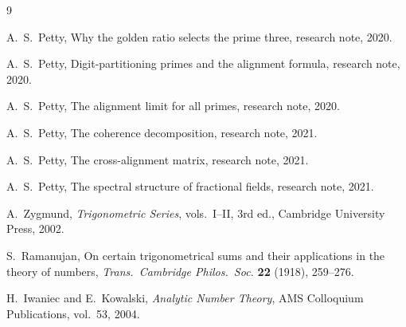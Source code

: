 \documentclass[12pt]{amsart}
\theoremstyle{definition}
\theoremstyle{remark}
\begin{document}
\begin{thebibliography}{9}

A.~S.~Petty,
Why the golden ratio selects the prime three,
research note, 2020.

A.~S.~Petty,
Digit-partitioning primes and the alignment formula,
research note, 2020.

A.~S.~Petty,
The alignment limit for all primes,
research note, 2020.

A.~S.~Petty,
The coherence decomposition,
research note, 2021.

A.~S.~Petty,
The cross-alignment matrix,
research note, 2021.

A.~S.~Petty,
The spectral structure of fractional fields,
research note, 2021.

A.~Zygmund,
\emph{Trigonometric Series}, vols.~I--II,
3rd ed., Cambridge University Press, 2002.

S.~Ramanujan,
On certain trigonometrical sums and their applications in the
theory of numbers,
\emph{Trans.\ Cambridge Philos.\ Soc.} \textbf{22} (1918), 259--276.

H.~Iwaniec and E.~Kowalski,
\emph{Analytic Number Theory},
AMS Colloquium Publications, vol.~53, 2004.

\end{thebibliography}
\end{document}
